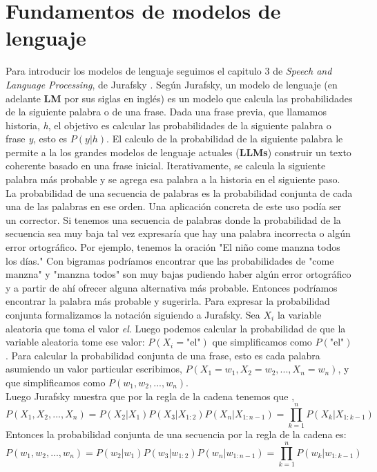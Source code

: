 \documentclass[11pt,a4paper,twoside]{tesis}
\begin{document}
\section{Fundamentos de modelos de lenguaje}
Para introducir los modelos de lenguaje seguimos el capitulo 3 de \textit{Speech and Language Processing}, de Jurafsky \cite{jurafsky2014speech}. Según Jurafsky, un modelo de lenguaje (en adelante \textbf{LM} por sus siglas en inglés) es un modelo que calcula las probabilidades de la siguiente palabra o de una frase. Dada una frase previa, que llamamos historia, \textit{h}, el objetivo es calcular las probabilidades de la siguiente palabra o frase \textit{y}, esto es $P(y|h)$. El calculo de la probabilidad de la siguiente palabra le permite a la los grandes modelos de lenguaje actuales (\textbf{LLMs}) construir un texto coherente basado en una frase inicial. Iterativamente, se calcula la siguiente palabra más probable y se agrega esa palabra a la historia en el siguiente paso. \\
La probabilidad de una secuencia de palabras es la probabilidad conjunta de cada una de las palabras en ese orden. Una aplicación concreta de este uso podía ser un corrector. Si tenemos una secuencia de palabras donde la probabilidad de la secuencia sea muy baja tal vez expresaría que hay una palabra incorrecta o algún error ortográfico. Por ejemplo, tenemos la oración "El niño come manzna todos los días." Con bigramas podríamos encontrar que las probabilidades de "come manzna" y "manzna todos" son muy bajas pudiendo haber algún error ortográfico y a partir de ahí ofrecer alguna alternativa más probable. Entonces podríamos encontrar la palabra más probable y sugerirla.  
Para expresar la probabilidad conjunta formalizamos la notación siguiendo a Jurafsky. Sea $X_i$ la variable aleatoria que toma el valor \textit{el}. Luego podemos calcular la probabilidad de que la variable aleatoria tome ese valor: $P(X_i=\text{"el"})$ que simplificamos como $P(\text{"el"})$. Para calcular la probabilidad conjunta de una frase, esto es cada palabra asumiendo un valor particular escribimos, $P(X_1=w_1,X_2=w_2,...,X_n=w_n)$, y que simplificamos como $P(w_1, w_2, ..., w_n)$. \\
Luego Jurafsky muestra que por la regla de la cadena tenemos que ,
\begin{equation}
P(X_1,X_2, ...,X_n) = P(X_2|X_1)P(X_3|X_{1:2})P(X_n|X_{1:n-1})    
= \prod_{k=1}^{n} P(X_k|X_{1:k-1})
\end{equation}
Entonces la probabilidad conjunta de una secuencia por la regla de la cadena es:
\begin{equation}
P(w_1,w_2, ...,w_n) = P(w_2|w_1)P(w_3|w_{1:2})P(w_n|w_{1:n-1})    
= \prod_{k=1}^{n} P(w_k|w_{1:k-1})
\label{eq:regla_cadena}
\end{equation}
\end{document}
